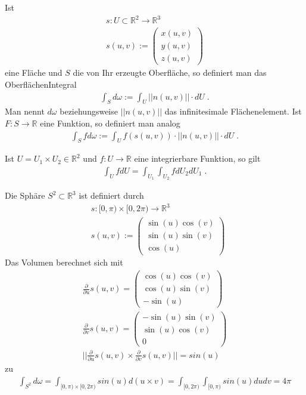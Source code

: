 \begin{Definition}
Ist 
\begin{align*}
s: U \subset \mathbb{R}^2 \to \mathbb{R}^3 \\
s(u,v) := \begin{pmatrix} x(u,v) \\ y(u,v) \\ z(u,v) \end{pmatrix} 
\end{align*} 
eine Fläche und $S$ die von Ihr erzeugte Oberfläche, so definiert man  das OberflächenIntegral
\begin{align*}
\int_S d \omega:= \int_U ||n(u,v)|| \cdot dU \;.
\end{align*} 
Man nennt $d \omega$ beziehungsweise $ ||n(u,v)||$ das infinitesimale Flächenelement.
Ist $F: S \to \mathbb{R}$ eine Funktion, so definiert man analog
\begin{align*}
\int_S f d \omega:= \int_U f(s(u,v)) \cdot ||n(u,v)|| \cdot dU \;.
\end{align*} 
\end{Definition}

\begin{Satz}
Ist $U = U_1 \times U_2 \in \mathbb{R}^2$ und $f: U \to \mathbb{R}$ eine integrierbare Funktion, so gilt
\begin{align*}
\int_U f dU = \int_{U_1} \int_{U_2} f  dU_2 dU_1 \;.
\end{align*} 
\end{Satz}

\begin{Beispiel}
Die  Sphäre $S^2 \subset \mathbb{R}^3$ ist definiert durch 
\begin{align*}
& s:  [0, \pi) \times  [0, 2 \pi)  \to \mathbb{R}^3 \\
 & s(u,v) :=  
 \begin{pmatrix}  \sin(u) \cos(v) \\   \sin(u) \sin(v) \\   \cos(u)  \end{pmatrix}
\end{align*} 
Das Volumen berechnet sich mit
\begin{align*}
\frac{\partial}{\partial u} s(u,v) =  \begin{pmatrix}  \cos(u) \cos(v) \\   \cos(u) \sin(v) \\   -\sin(u)  \end{pmatrix} \\
\frac{\partial}{\partial v} s(u,v) =  \begin{pmatrix}  -\sin(u) \sin(v) \\   \sin(u) \cos(v) \\   0  \end{pmatrix} \\
||\frac{\partial}{\partial u} s(u,v) \times \frac{\partial}{\partial v} s(u,v) || = sin(u)
\end{align*} 
zu
\begin{align*}
\int_{S^2} d\omega  = \int_{[0, \pi) \times  [0, 2 \pi) } sin(u) d(u \times v) =   \int_{[0, 2 \pi) }   \int_{[0, \pi) } sin(u) du dv = 4 \pi
\end{align*} 
\end{Beispiel}

